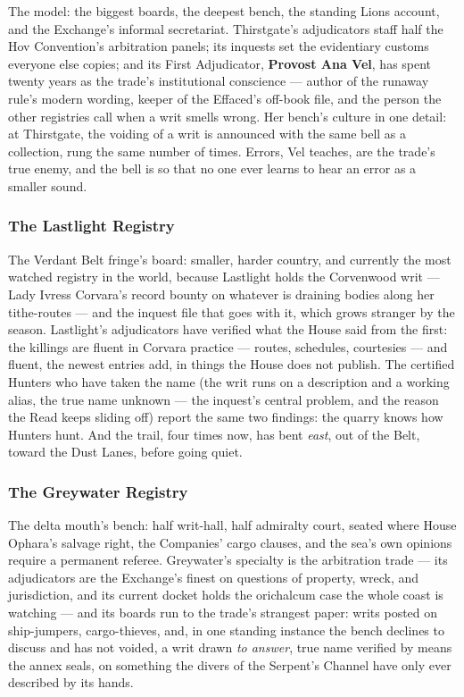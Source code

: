The model: the biggest boards, the deepest bench, the standing Lions account, and the Exchange's informal secretariat. Thirstgate's adjudicators staff half the Hov Convention's arbitration panels; its inquests set the evidentiary customs everyone else copies; and its First Adjudicator, \textbf{Provost Ana Vel}, has spent twenty years as the trade's institutional conscience --- author of the runaway rule's modern wording, keeper of the Effaced's off-book file, and the person the other registries call when a writ smells wrong. Her bench's culture in one detail: at Thirstgate, the voiding of a writ is announced with the same bell as a collection, rung the same number of times. Errors, Vel teaches, are the trade's true enemy, and the bell is so that no one ever learns to hear an error as a smaller sound.

\subsubsection{The Lastlight Registry}

The Verdant Belt fringe's board: smaller, harder country, and currently the most watched registry in the world, because Lastlight holds the Corvenwood writ --- Lady Ivress Corvara's record bounty on whatever is draining bodies along her tithe-routes --- and the inquest file that goes with it, which grows stranger by the season. Lastlight's adjudicators have verified what the House said from the first: the killings are fluent in Corvara practice --- routes, schedules, courtesies --- and fluent, the newest entries add, in things the House does not publish. The certified Hunters who have taken the name (the writ runs on a description and a working alias, the true name unknown --- the inquest's central problem, and the reason the Read keeps sliding off) report the same two findings: the quarry knows how Hunters hunt. And the trail, four times now, has bent \textit{east}, out of the Belt, toward the Dust Lanes, before going quiet.

\subsubsection{The Greywater Registry}

The delta mouth's bench: half writ-hall, half admiralty court, seated where House Ophara's salvage right, the Companies' cargo clauses, and the sea's own opinions require a permanent referee. Greywater's specialty is the arbitration trade --- its adjudicators are the Exchange's finest on questions of property, wreck, and jurisdiction, and its current docket holds the orichalcum case the whole coast is watching --- and its boards run to the trade's strangest paper: writs posted on ship-jumpers, cargo-thieves, and, in one standing instance the bench declines to discuss and has not voided, a writ drawn \textit{to answer}, true name verified by means the annex seals, on something the divers of the Serpent's Channel have only ever described by its hands.

